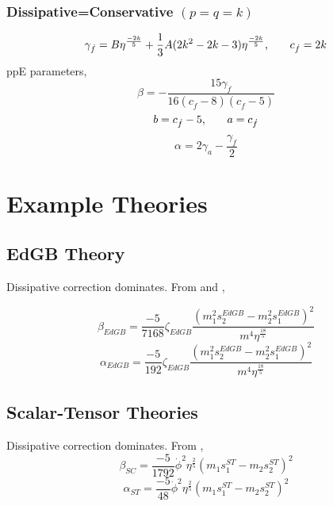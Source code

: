 \documentclass[11pt]{article}
\begin{document}
\subsubsection*{Dissipative=Conservative $(p=q=k)$}
\begin{equation}
\gamma_{\dot{f}}=B\eta^\frac{-2k}{5}+\frac{1}{3}A(2k^2-2k-3)\eta^{\frac{-2k}{5}}\text{,\hspace*{20pt}}c_{\dot{f}}=2k
\end{equation}
ppE parameters,
\begin{equation}
\beta=-\frac{15 \text{$\gamma_{\dot{f}} $}}{16 (\text{$c_{\dot{f}}$}-8) (\text{$c_{\dot{f}}$}-5)}
\end{equation}
\begin{equation}
b=c_{\dot{f}}-5\text{,\hspace*{20pt}}a=c_{\dot{f}}
\end{equation}
\begin{equation}
\alpha=2 \text{$\gamma_a $}-\frac{\text{$\gamma_{\dot{f}} $}}{2}
\end{equation}
\vspace{50pt}
 \section{Example Theories}
 \vspace*{20pt}
 \subsection{EdGB Theory}
 Dissipative correction dominates. From \cite{Yunes:2016jcc} and \cite{Yagi:2011xp},
 
 \begin{equation}
 \beta_{EdGB}=\frac{-5}{7168}\zeta_{EdGB}\frac{(m_1^2s_2^{EdGB}-m_2^2s_1^{EdGB})^2}{m^4\eta^{\frac{18}{5}}}
 \end{equation}
 \begin{equation}
 \alpha_{EdGB}=\frac{-5}{192}\zeta_{EdGB}\frac{(m_1^2s_2^{EdGB}-m_2^2s_1^{EdGB})^2}{m^4\eta^{\frac{18}{5}}}
 \end{equation}
 \subsection{Scalar-Tensor Theories}
 Dissipative correction dominates.  From \cite{Yunes:2016jcc},
 \begin{equation}
 \beta_{SC}=\frac{-5}{1792}\dot{\phi}^2\eta^{\frac{2}{5}}(m_1s_1^{ST}-m_2s_2^{ST})^2
 \end{equation}
 \begin{equation}
 \alpha_{ST}=\frac{-5}{48}\dot{\phi}^2\eta^{\frac{2}{5}}(m_1s_1^{ST}-m_2s_2^{ST})^2
 \end{equation}
\end{document}
